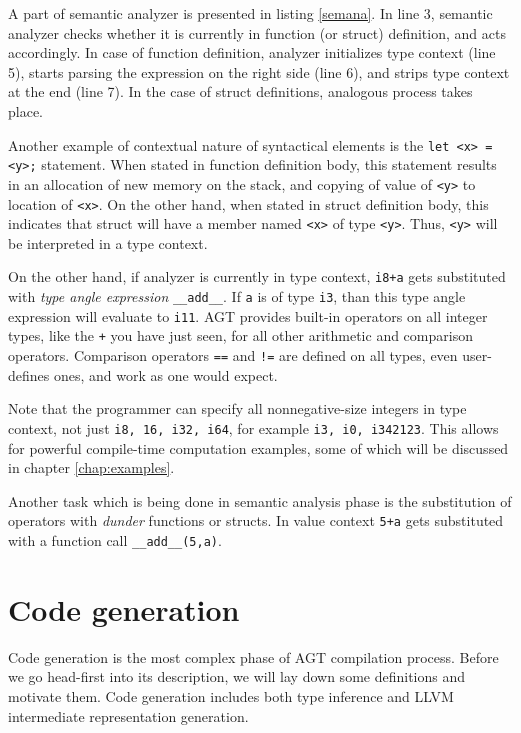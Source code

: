 \documentclass[times, utf8, diplomski]{fer}
\theoremstyle{definition}
\newcommand{\pythoncode}[3]{
    
}
\begin{document}
A part of semantic analyzer is presented in listing \ref{semana}.
In line 3, semantic analyzer checks whether it is currently in function (or struct) definition, 
and acts accordingly. In case of function definition, analyzer initializes type context (line 5),
starts parsing the expression on the right side (line 6), 
and strips type context at the end (line 7).
In the case of struct definitions, analogous process takes place.

\pythoncode{\resdir/compiler/initex.py}{semana}{Semantic analysis rule example}

Another example of contextual nature of syntactical elements is the \texttt{let <x> = <y>;} statement.
When stated in function definition body, this statement results in an allocation 
of new memory on the stack,
and copying of value of \texttt{<y>} to location of \texttt{<x>}.
On the other hand, when stated in struct definition body, this indicates that
struct will have a member named \texttt{<x>} of type \texttt{<y>}. 
Thus, \texttt{<y>} will be interpreted in a type context.

On the other hand,
if analyzer is currently in type context, \texttt{i8+a} gets substituted with
\textit{type angle expression} \texttt{\_\_add\_\_<i8, a>}. If \texttt{a} is of type \texttt{i3},
than this type angle expression will evaluate to \texttt{i11}. AGT provides built-in operators
on all integer types, like the \texttt{+} you have just seen, for all other arithmetic and
comparison operators. Comparison operators \texttt{==} and \texttt{!=} are defined on all types, 
even user-defines ones, and work as one would expect.

Note that the programmer can specify all nonnegative-size 
integers in type context, not just \texttt{i8, 16, i32, i64},
for example \texttt{i3, i0, i342123}.
This allows for powerful compile-time computation examples, 
some of which will be discussed in chapter \ref{chap:examples}.

Another task which is being done in semantic analysis phase is the substitution of operators with 
\textit{dunder} functions or structs. In value context \texttt{5+a} gets
substituted with a function call \texttt{\_\_add\_\_(5,a)}. 


\section{Code generation}\label{sect:codegen}

Code generation is the most complex phase of AGT compilation process.
Before we go head-first into its description, we will lay down some definitions
and motivate them. Code generation includes both type inference and LLVM intermediate representation
generation. 
\end{document}
